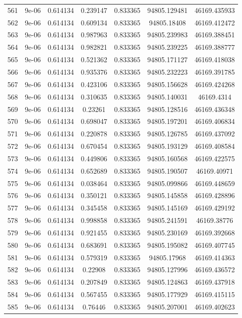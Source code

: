 \begin{table}
\begin{tabular*}{\linewidth}{c|c|c|c|c|c|c}
561 & 9e-06 & 0.614134 & 0.239147 & 0.833365 & 94805.129481 & 46169.435933\\
562 & 9e-06 & 0.614134 & 0.609134 & 0.833365 & 94805.18408 & 46169.412472\\
563 & 9e-06 & 0.614134 & 0.987963 & 0.833365 & 94805.239983 & 46169.388451\\
564 & 9e-06 & 0.614134 & 0.982821 & 0.833365 & 94805.239225 & 46169.388777\\
565 & 9e-06 & 0.614134 & 0.521362 & 0.833365 & 94805.171127 & 46169.418038\\
566 & 9e-06 & 0.614134 & 0.935376 & 0.833365 & 94805.232223 & 46169.391785\\
567 & 9e-06 & 0.614134 & 0.423106 & 0.833365 & 94805.156628 & 46169.424268\\
568 & 9e-06 & 0.614134 & 0.310635 & 0.833365 & 94805.140031 & 46169.4314\\
569 & 9e-06 & 0.614134 & 0.23261 & 0.833365 & 94805.128516 & 46169.436348\\
570 & 9e-06 & 0.614134 & 0.698047 & 0.833365 & 94805.197201 & 46169.406834\\
571 & 9e-06 & 0.614134 & 0.220878 & 0.833365 & 94805.126785 & 46169.437092\\
572 & 9e-06 & 0.614134 & 0.670454 & 0.833365 & 94805.193129 & 46169.408584\\
573 & 9e-06 & 0.614134 & 0.449806 & 0.833365 & 94805.160568 & 46169.422575\\
574 & 9e-06 & 0.614134 & 0.652689 & 0.833365 & 94805.190507 & 46169.40971\\
575 & 9e-06 & 0.614134 & 0.038464 & 0.833365 & 94805.099866 & 46169.448659\\
576 & 9e-06 & 0.614134 & 0.350121 & 0.833365 & 94805.145858 & 46169.428896\\
577 & 9e-06 & 0.614134 & 0.345458 & 0.833365 & 94805.145169 & 46169.429192\\
578 & 9e-06 & 0.614134 & 0.998858 & 0.833365 & 94805.241591 & 46169.38776\\
579 & 9e-06 & 0.614134 & 0.921455 & 0.833365 & 94805.230169 & 46169.392668\\
580 & 9e-06 & 0.614134 & 0.683691 & 0.833365 & 94805.195082 & 46169.407745\\
581 & 9e-06 & 0.614134 & 0.579319 & 0.833365 & 94805.17968 & 46169.414363\\
582 & 9e-06 & 0.614134 & 0.22908 & 0.833365 & 94805.127996 & 46169.436572\\
583 & 9e-06 & 0.614134 & 0.207849 & 0.833365 & 94805.124863 & 46169.437918\\
584 & 9e-06 & 0.614134 & 0.567455 & 0.833365 & 94805.177929 & 46169.415115\\
585 & 9e-06 & 0.614134 & 0.76446 & 0.833365 & 94805.207001 & 46169.402623\\
\end{tabular*}
\end{table}
